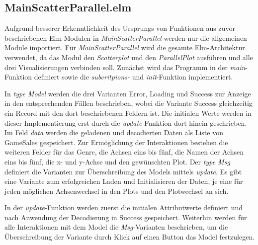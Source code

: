 \documentclass[usegeometry=true]{scrartcl}
\begin{document}
\subsection{MainScatterParallel.elm}
Aufgrund besserer Erkenntlichkeit des Ursprungs von Funktionen aus zuvor beschriebenen Elm-Modulen in \textit{MainScatterParallel}
werden nur die allgemeinen Module importiert. 
Für \textit{MainScatterParallel} wird die gesamte Elm-Architektur verwendet, da das Modul den \textit{Scatterplot} und den \textit{ParallelPlot} ausführen 
und alle drei Visualisierungen verbinden soll.
Zunächst wird das Programm in der \textit{main}-Funktion definiert sowie die \textit{subcritpions-} und \textit{init}-Funktion implementiert.

In \textit{type Model} werden die drei Varianten Error, Loading und Success zur Anzeige in den entsprechenden Fällen beschrieben, 
wobei die Variante Success gleichzeitig ein Record mit den dort beschriebenen Feldern ist. 
Die initialen Werte werden in dieser Implementierung erst durch die \textit{update}-Funktion dort hinein geschrieben.
Im Feld \textit{data} werden die geladenen und decodierten Daten als Liste von GameSales gespeichert. 
Zur Ermöglichung der Interaktionen bestehen die weiteren Felder für das Genre, die Achsen eins bis fünf, 
die Namen der Achsen eins bis fünf, die x- und y-Achse und den gewünschten Plot. 
Der \textit{type Msg} definiert die Varianten zur Überschreibung des Models mittels \textit{update}. 
Es gibt eine Variante zum erfolgreichen Laden und Initialisieren der Daten, je eine für jeden möglichen Achsenwechsel in den Plots und den Plotwechsel an sich.

In der \textit{update}-Funktion werden zuerst die initialen Attributwerte definiert und nach Anwendung der Decodierung in Success gespeichert. 
Weiterhin werden für alle Interaktionen mit dem Model die \textit{Msg}-Varianten beschrieben, 
um die Überschreibung der Variante durch Klick auf einen Button das Model festzulegen.
\end{document}
